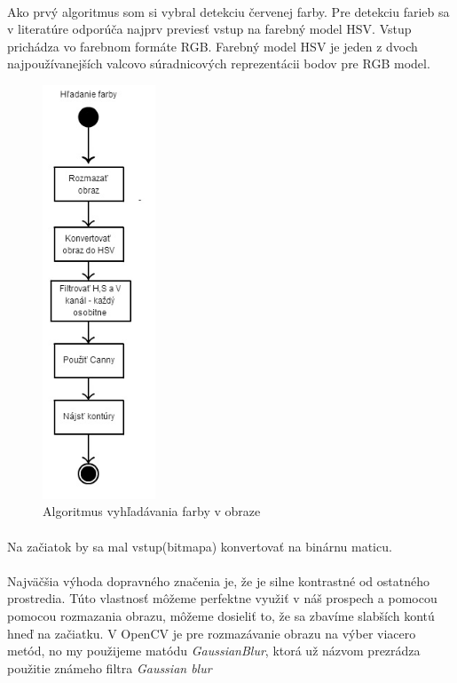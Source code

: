\documentclass[12pt]{article}
\begin{document}
\paragraph{}
Ako prvý algoritmus som si vybral detekciu červenej farby. Pre detekciu farieb sa v literatúre odporúča najprv previesť vstup na farebný model HSV. 
Vstup prichádza vo farebnom formáte RGB. Farebný model HSV je jeden z dvoch najpoužívanejších valcovo súradnicových reprezentácii bodov pre RGB model.
\cite{hsl_hsv}
\begin{figure}[p]
\centering
\includegraphics[width=0.3\textwidth,natwidth=160,natheight=586]{hladanie_farby.jpg}
\vspace{-20pt}
\caption{Algoritmus vyhľadávania farby v obraze}
\vspace{-10pt}
\label{hladanie_farby}
\end{figure}
\paragraph{}
Na začiatok by sa mal vstup(bitmapa) konvertovať na binárnu maticu.
\paragraph{}
Najväčšia výhoda dopravného značenia je, že je silne kontrastné od ostatného prostredia.
Túto vlastnosť môžeme perfektne využiť v náš prospech a pomocou pomocou rozmazania obrazu, môžeme dosieliť to,
že sa zbavíme slabších kontú hneď na začiatku. V OpenCV je pre rozmazávanie obrazu na výber viacero metód,
no my použijeme matódu \emph{GaussianBlur}, ktorá už názvom prezrádza použitie známeho filtra \emph{Gaussian blur}
\end{document}
